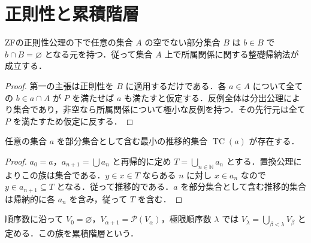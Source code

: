 \section{正則性と累積階層}
\begin{prop}[所属関係の整礎性]
ZFの正則性公理の下で任意の集合 $A$ の空でない部分集合 $B$ は $b\in B$ で $b\cap B=\varnothing$ となる元を持つ．従って集合 $A$ 上で所属関係に関する整礎帰納法が成立する．
\end{prop}
\begin{proof}
第一の主張は正則性を $B$ に適用するだけである．各 $a\in A$ について全ての $b\in a\cap A$ が $P$ を満たせば $a$ も満たすと仮定する．反例全体は分出公理により集合であり，非空なら所属関係について極小な反例を持つ．その先行元は全て $P$ を満たすため仮定に反する．
\end{proof}
\begin{prop}[推移閉包]
任意の集合 $a$ を部分集合として含む最小の推移的集合 $\operatorname{TC}(a)$ が存在する．
\end{prop}
\begin{proof}
$a_0=a$，$a_{n+1}=\bigcup a_n$ と再帰的に定め $T=\bigcup_{n\in\mathbb N}a_n$ とする．置換公理によりこの族は集合である．$y\in x\in T$ ならある $n$ に対し $x\in a_n$ なので $y\in a_{n+1}\subseteq T$ となる．従って推移的である．$a$ を部分集合として含む推移的集合は帰納的に各 $a_n$ を含み，従って $T$ を含む．
\end{proof}
\begin{defn}[累積階層]
順序数に沿って $V_0=\varnothing$，$V_{\alpha+1}=\mathcal P(V_\alpha)$，極限順序数 $\lambda$ では $V_\lambda=\bigcup_{\beta<\lambda}V_\beta$ と定める．この族を累積階層という．
\end{defn}
